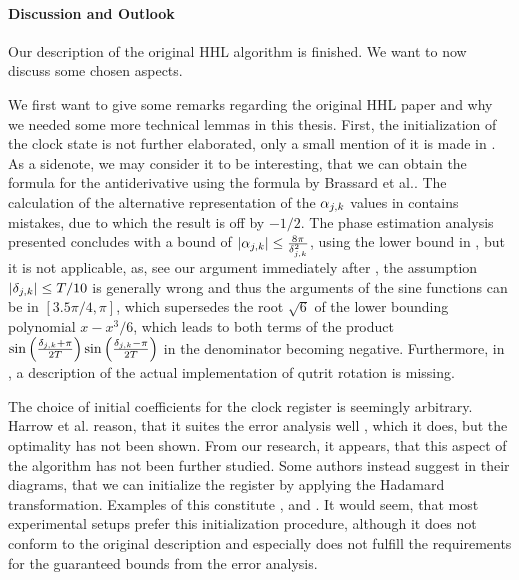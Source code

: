 \paragraph*{Discussion and Outlook} Our description of the original HHL algorithm is finished. We want to now discuss some chosen aspects.

\phantom{}

We first want to give some remarks regarding the original HHL paper and why we needed some more technical lemmas in this thesis. First, the initialization of the clock state is not further elaborated, only a small mention of it is made in \cite[p. 2]{Harrow2008}. As a sidenote, we may consider it to be interesting, that we can obtain the formula for the antiderivative using the formula by Brassard et al.. The calculation of the alternative representation of the \(\alpha_{j, k}\) values in  contains mistakes, due to which the result is off by \(-1/2\). The phase estimation analysis presented \cite[pp. 10-11]{Harrow2008} concludes with a bound of \(|\alpha_{j, k}| \leq \frac{8\pi}{\delta_{j, k}^2}\), using the lower bound in , but it is not applicable, as, see our argument immediately after , the assumption \(|\delta_{j, k}| \leq T/10\) is generally wrong and thus the arguments of the sine functions can be in \([3.5\pi/4, \pi]\), which supersedes the root \(\sqrt{6}\) of the lower bounding polynomial \(x-x^3/6\), which leads to both terms of the product \(\sin\left(\frac{\delta_{j, k} + \pi}{2T}\right)\sin\left(\frac{\delta_{j, k} - \pi}{2T}\right)\) in the denominator becoming negative. Furthermore, in \cite[p. 6]{Harrow2008}, a description of the actual implementation of qutrit rotation is missing.

\phantom{}

The choice of initial coefficients for the clock register is seemingly arbitrary. Harrow et al. reason, that it suites the error analysis well \cite[p. 2]{Harrow2008}, which it does, but the optimality has not been shown. From our research, it appears, that this aspect of the algorithm has not been further studied. Some authors instead suggest in their diagrams, that we can initialize the register by applying the Hadamard transformation. Examples of this constitute \cite[p. 30]{Dervovic2018}, \cite[p. 351]{Kasirajan2021} and \cite[p. 5]{Lee2019}. It would seem, that most experimental setups prefer this initialization procedure, although it does not conform to the original description and especially does not fulfill the requirements for the guaranteed bounds from the error analysis.

